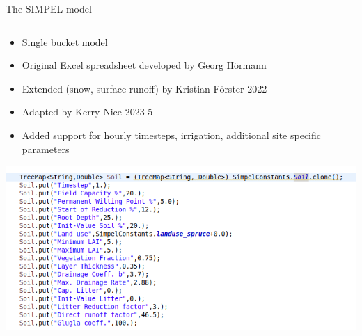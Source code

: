 \documentclass{beamer}
\begin{document}
\begin{frame}{The SIMPEL model} 


\begin{columns}

\begin{column}{0.5\textwidth}
\begin{itemize}
\item Single bucket model
\item Original Excel spreadsheet developed by Georg Hörmann
\item Extended (snow, surface runoff) by Kristian Förster 2022
\item Adapted by Kerry Nice 2023-5
\item Added support for hourly timesteps, irrigation, additional site specific parameters
\end{itemize}
\includegraphics[scale=0.33]{Screenshot_20250703_140316.png}
\end{column}


\end{columns}
\end{frame}
\end{document}
